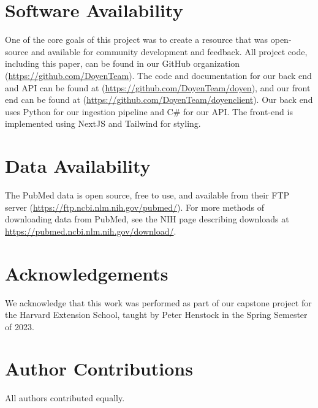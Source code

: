 \section{Software Availability}

One of the core goals of this project was to create a resource that was open-source and available for community development and feedback. All project code, including this paper, can be found in our GitHub organization (\url{https://github.com/DoyenTeam}). The code and documentation for our back end and API can be found at (\url{https://github.com/DoyenTeam/doyen}), and our front end can be found at (\url{https://github.com/DoyenTeam/doyenclient}). Our back end uses Python for our ingestion pipeline and C# for our API. The front-end is implemented using NextJS and Tailwind for styling.

\section{Data Availability}

The PubMed data is open source, free to use, and available from their FTP server (\url{https://ftp.ncbi.nlm.nih.gov/pubmed/}). For more methods of downloading data from PubMed, see the NIH page describing downloads at \url{https://pubmed.ncbi.nlm.nih.gov/download/}.

\section{Acknowledgements}

We acknowledge that this work was performed as part of our capstone project for the Harvard Extension School, taught by Peter Henstock in the Spring Semester of 2023.

\section{Author Contributions}

All authors contributed equally.

